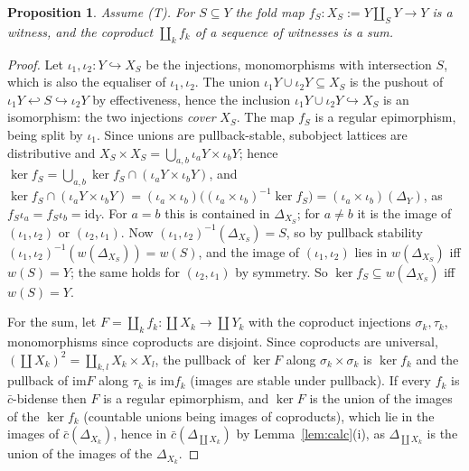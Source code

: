 \documentclass[11pt]{amsart}
\newtheorem{prop}[thm]{Proposition}
\theoremstyle{definition}
\newcommand{\im}{\mathrm{im}}
\begin{document}
\begin{prop}\label{prop:witnessT}
Assume (T). For $S\subseteq Y$ the fold map $f_S\colon X_S:=Y\amalg_SY\to Y$
is a witness, and the coproduct $\coprod_kf_k$ of a sequence of witnesses
is a sum.
\end{prop}
\begin{proof}
Let $\iota_1,\iota_2\colon Y\hookrightarrow X_S$ be the injections, monomorphisms
with intersection $S$, which is also the equaliser of $\iota_1,\iota_2$.
The union $\iota_1Y\cup\iota_2Y\subseteq X_S$ is the pushout of
$\iota_1Y\hookleftarrow S\hookrightarrow\iota_2Y$ by effectiveness, hence the
inclusion $\iota_1Y\cup\iota_2Y\hookrightarrow X_S$ is an isomorphism: the two
injections \emph{cover} $X_S$. The map $f_S$ is a regular epimorphism,
being split by $\iota_1$. Since unions are pullback-stable, subobject
lattices are distributive and $X_S\times X_S=\bigcup_{a,b}\iota_aY\times
\iota_bY$; hence $\ker f_S=\bigcup_{a,b}\ker f_S\cap(\iota_aY\times\iota_bY)$,
and $\ker f_S\cap(\iota_aY\times\iota_bY)=(\iota_a\times\iota_b)
\bigl((\iota_a\times\iota_b)^{-1}\ker f_S\bigr)=(\iota_a\times\iota_b)(\Delta_Y)$,
as $f_S\iota_a=f_S\iota_b=\mathrm{id}_Y$. For $a=b$ this is contained in
$\Delta_{X_S}$; for $a\ne b$ it is the image of $(\iota_1,\iota_2)$ or
$(\iota_2,\iota_1)$. Now $(\iota_1,\iota_2)^{-1}(\Delta_{X_S})=S$, so by
pullback stability $(\iota_1,\iota_2)^{-1}(w(\Delta_{X_S}))=w(S)$, and the
image of $(\iota_1,\iota_2)$ lies in $w(\Delta_{X_S})$ iff $w(S)=Y$; the
same holds for $(\iota_2,\iota_1)$ by symmetry. So $\ker f_S\subseteq
w(\Delta_{X_S})$ iff $w(S)=Y$.

For the sum, let $F=\coprod_kf_k\colon\coprod X_k\to\coprod Y_k$ with the
coproduct injections $\sigma_k,\tau_k$, monomorphisms since coproducts are
disjoint. Since coproducts are universal, $(\coprod X_k)^2=\coprod_{k,l}
X_k\times X_l$, the pullback of $\ker F$ along $\sigma_k\times\sigma_k$ is
$\ker f_k$ and the pullback of $\im F$ along $\tau_k$ is $\im f_k$ (images
are stable under pullback). If every $f_k$ is $\bar c$-bidense then $F$ is a
regular epimorphism, and $\ker F$ is the union of the images of the
$\ker f_k$ (countable unions being images of coproducts), which lie in the
images of $\bar c(\Delta_{X_k})$, hence in $\bar c(\Delta_{\coprod X_k})$ by
Lemma~\ref{lem:calc}(i), as $\Delta_{\coprod X_k}$ is the union of the images
of the $\Delta_{X_k}$.
\end{proof}
\end{document}
